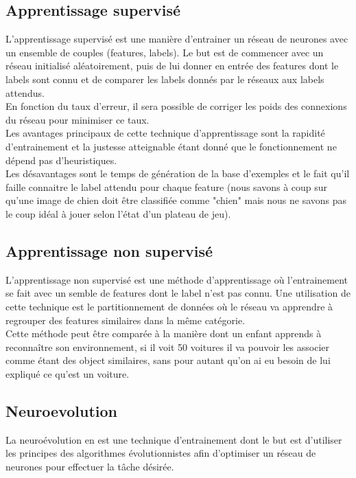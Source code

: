 \documentclass{article}
\begin{document}
\subsection{Apprentissage supervisé}

L'apprentissage supervisé est une manière d'entrainer un réseau de neurones avec un ensemble de couples (features, labels). Le but est de commencer avec un réseau initialisé aléatoirement, puis de lui donner en entrée des features dont le labels sont connu et de comparer les labels donnés par le réseaux aux labels attendus.\\
En fonction du taux d'erreur, il sera possible de corriger les poids des connexions du réseau pour minimiser ce taux.\\

Les avantages principaux de cette technique d'apprentissage sont la rapidité d'entrainement et la justesse atteignable étant donné que le fonctionnement ne dépend pas d'heuristiques.\\

Les désavantages sont le temps de génération de la base d'exemples et le fait qu'il faille connaitre le label attendu pour chaque feature (nous savons à coup sur qu'une image de chien doit être classifiée comme "chien" mais nous ne savons pas le coup idéal à jouer selon l'état d'un plateau de jeu). 

\subsection{Apprentissage non supervisé}

L'apprentissage non supervisé est une méthode d'apprentissage où l'entrainement se fait avec un semble de features dont le label n'est pas connu. Une utilisation de cette technique est le partitionnement de données où le réseau va apprendre à regrouper des features similaires dans la même catégorie.\\

Cette méthode peut être comparée à la manière dont un enfant apprends à reconnaître son environnement, si il voit 50 voitures il va pouvoir les associer comme étant des object similaires, sans pour autant qu'on ai eu besoin de lui expliqué ce qu'est un voiture.

\subsection{Neuroevolution}

La neuroévolution en est une technique d'entrainement dont le but est d'utiliser les principes des algorithmes évolutionnistes afin d'optimiser un réseau de neurones pour effectuer la tâche désirée.\\
\end{document}
